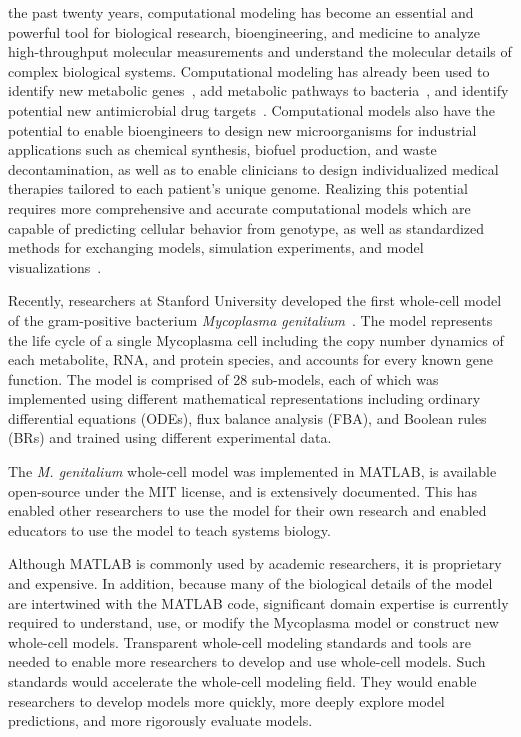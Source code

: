 \documentclass[journal,transmag]{IEEEtran}
\begin{document}
 the past twenty years, computational modeling has become an essential and powerful tool for biological research, bioengineering, and medicine to analyze high-throughput molecular measurements and understand the molecular details of complex biological systems. 
Computational modeling has already been used to identify new metabolic genes~\cite{Reed2006}, add metabolic pathways to bacteria~\cite{Lee2009}, and identify potential new antimicrobial drug targets~\cite{Lee2012}. 
Computational models also have the potential to enable bioengineers to design new microorganisms for industrial applications such as chemical synthesis, biofuel production, and waste decontamination, as well as to enable clinicians to design individualized medical therapies tailored to each patient's unique genome. 
Realizing this potential requires more comprehensive and accurate computational models which are capable of predicting cellular behavior from genotype, as well as standardized methods for exchanging models, simulation experiments, and model visualizations~\cite{Macklin2014,Karr2015,Klipp07}.

Recently, researchers at Stanford University developed the first whole-cell model of the gram-positive bacterium \textit{Mycoplasma genitalium}~\cite{Karr2012}. 
The model represents the life cycle of a single Mycoplasma cell including the copy number dynamics of each metabolite, RNA, and protein species, and accounts for every known gene function. 
The model is comprised of 28 sub-models, each of which was implemented using different mathematical representations including ordinary differential equations (ODEs), flux balance analysis (FBA), and Boolean rules (BRs) and trained using different experimental data. 

The \textit{M. genitalium} whole-cell model was implemented in MATLAB, is available open-source under the MIT license, and is extensively documented. 
This has enabled other researchers to use the model for their own research and enabled educators to use the model to teach systems biology. 

Although MATLAB is commonly used by academic researchers, it is proprietary and expensive. In addition, because many of the biological details of the model are intertwined with the MATLAB code, significant domain expertise is currently required to understand, use, or modify the Mycoplasma model or construct new whole-cell models. 
Transparent whole-cell modeling standards and tools are needed to enable more researchers to develop and use whole-cell models. 
Such standards would accelerate the whole-cell modeling field. They would enable researchers to develop models more quickly, more deeply explore model predictions, and more rigorously evaluate models. 
\end{document}
